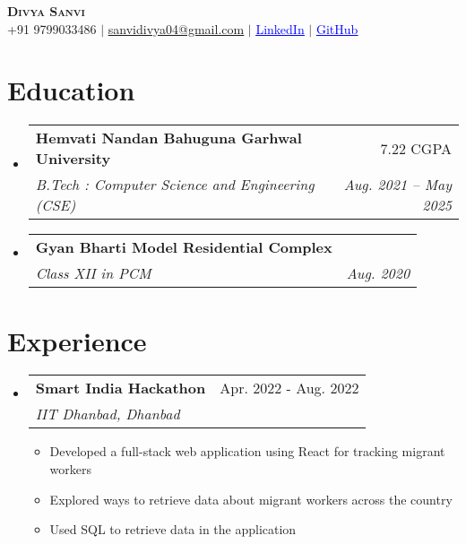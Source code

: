 \documentclass[letterpaper,11pt]{article}
\makeatletter
\newcommand{\resumeItem}[1]{\item\small{#1 \vspace{-2pt}}}
\newcommand{\resumeSubheading}[4]{\vspace{-2pt}\item\begin{tabular*}{0.97\textwidth}[t]{l@{\extracolsep{\fill}}r}\textbf{#1} & #2 \\ \textit{\small#3} & \textit{\small #4} \\ \end{tabular*}\vspace{-7pt}}
\newcommand{\resumeSubHeadingListStart}{\begin{itemize}[leftmargin=0.15in, label={}]}
\newcommand{\resumeSubHeadingListEnd}{\end{itemize}}
\newcommand{\resumeItemListStart}{\begin{itemize}}
\newcommand{\resumeItemListEnd}{\end{itemize}\vspace{-5pt}}
\makeatother
\begin{document}
\begin{center}
    {\Huge \scshape \textbf{Divya Sanvi}} \\ \vspace{1pt}
    \small +91 9799033486 $|$ \href{mailto:sanvidivya04@gmail.com}{\underline{sanvidivya04@gmail.com}} $|$ 
    \href{https://linkedin.com/in/divya-sanvi-ba8357262}{ \hspace{0.2em} \textcolor{blue}{\underline{LinkedIn}}} $|$ 
    \href{https://github.com/divyasanvi1}{ \hspace{0.2em} \textcolor{blue}{\underline{GitHub}}}
\end{center}

\section{Education}
\resumeSubHeadingListStart
    \resumeSubheading
      {Hemvati Nandan Bahuguna Garhwal University}{7.22 CGPA}
      {B.Tech : Computer Science and Engineering (CSE)}{Aug. 2021 -- May 2025}
    \resumeSubheading
      {Gyan Bharti Model Residential Complex}{}
      {Class XII in PCM}{Aug. 2020}
\resumeSubHeadingListEnd

\section{Experience}
\resumeSubHeadingListStart
    \resumeSubheading
      {Smart India Hackathon}{Apr. 2022 - Aug. 2022}
      {IIT Dhanbad, Dhanbad}{}
      \resumeItemListStart
        \resumeItem{Developed a full-stack web application using React for tracking migrant workers}
        \resumeItem{Explored ways to retrieve data about migrant workers across the country}
        \resumeItem{Used SQL to retrieve data in the application}
      \resumeItemListEnd
\resumeSubHeadingListEnd

\end{document}
